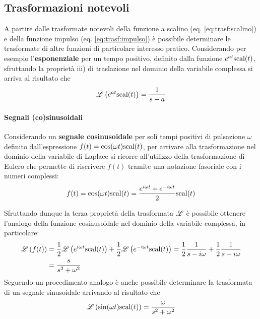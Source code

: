 	\subsection{Trasformazioni notevoli}
	    A partire dalle trasformate notevoli della funzione a scalino (eq. \ref{eq:trasf:scalino}) e della funzione impulso (eq. \ref{eq:trasf:impulso}) è possibile determinare le trasformate di altre funzioni di particolare interesso pratico. Considerando per esempio l'\textbf{esponenziale} per un tempo positivo, definito dalla funzione $e^{at}\textrm{scal}(t)$, sfruttando la proprietà iii) di traslazione nel dominio della variabile complessa si arriva al risultato che
	    \begin{equation}
	        \mathscr L \left( e^{at} \textrm{scal}(t) \right) = \frac 1 {s-a}
	    \end{equation}
	    
	    \paragraph{Segnali (co)sinusoidali} Considerando un \textbf{segnale cosinusoidale} per soli tempi positivi di pulsazione $\omega$ definito dall'espressione $f(t) = \cos(\omega t)\textrm{scal}(t)$, per arrivare alla trasformazione nel dominio della variabile di Laplace si ricorre all'utilizzo della trasformazione di Eulero che permette di riscrivere $f(t)$ tramite una notazione fasoriale con i numeri complessi:
	    \[ f(t) = \cos(\omega t) \textrm{scal}(t) = \frac{e^{i\omega t}+ e^{-i\omega t}}{2} \textrm{scal}(t)\]
	    
	    Sfruttando dunque la terza proprietà della trasformata $\mathscr L$ è possibile ottenere l'analogo della funzione cosinusoidale nel dominio della variabile complessa, in particolare:
	    \begin{equation}
	   	\begin{aligned}
	   		\mathscr L \left( f(t) \right) & = \frac 1 2 \mathscr L \left( e^{i\omega t}\textrm{scal}(t) \right) + \frac 1 2 \mathscr L \left( e^{-i\omega t} \textrm{scal}(t) \right) = \frac 1 2 \frac{1}{s-i\omega} + \frac 1 2 \frac{1}{s+i\omega} \\ & = \frac{s}{s^2+\omega^2}
	   	\end{aligned}
	    \end{equation}
	    Seguendo un procedimento analogo è anche possibile determinare la trasformata di un segnale sinusoidale arrivando al risultato che
	    \begin{equation}
	    	\mathscr L \left( \sin(\omega t) \textrm{scal}(t) \right) = \frac \omega {s^2 + \omega^2}
	    \end{equation}
	    
